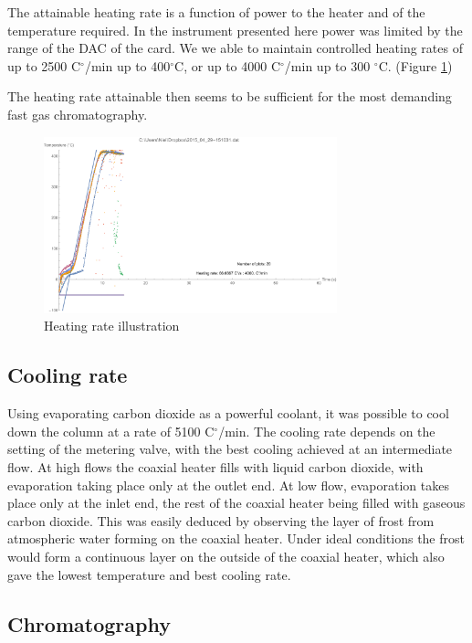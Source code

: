 \documentclass[aip,rsi,preprint,graphicx]{revtex4-1} %
\begin{document}
The attainable heating rate is a function of power to the heater and of the temperature required. In the instrument presented here power was limited by the range of the DAC of the card. We we able to maintain controlled heating rates of up to 2500 C$^\circ$/min up to 400$^\circ$C, or up to 4000 C$^\circ$/min up to 300 $^\circ$C. (Figure \ref{fig:MaxHeatingRate})

The heating rate attainable then seems to be sufficient for the most demanding fast gas chromatography. 

\begin{figure}
\includegraphics[width=8.5cm]{2015_04_30_Rate_analysis_4000}%
\caption{\label{fig:MaxHeatingRate}Heating rate illustration}%
\end{figure}

\subsection{Cooling rate}

Using evaporating carbon dioxide as a powerful coolant, it was possible to cool down the column at a rate of 5100 C$^\circ$/min. The cooling rate depends on the setting of the metering valve, with the best cooling achieved at an intermediate flow. At high flows the coaxial heater fills with liquid carbon dioxide, with evaporation taking place only at the outlet end. At low flow, evaporation takes place only at the inlet end, the rest of the coaxial heater being filled with gaseous carbon dioxide. This was easily deduced by observing the layer of frost from atmospheric water forming on the coaxial heater. Under ideal conditions the frost would form a continuous layer on the outside of the coaxial heater, which also gave the lowest temperature and best cooling rate.

\subsection{Chromatography}
\end{document}

